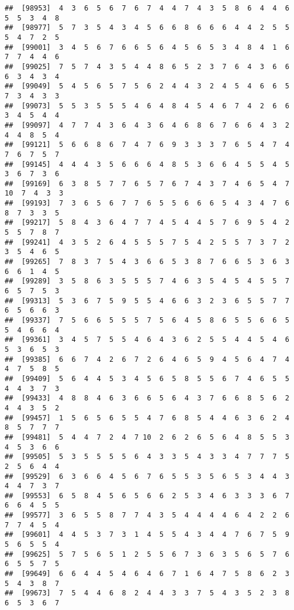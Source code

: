 \documentclass[
]{book}
\begin{document}
\begin{verbatim}
##  [98953]  4  3  6  5  6  7  6  7  4  4  7  4  3  5  8  6  4  4  6  5  5  3  4  8
##  [98977]  5  7  3  5  4  3  4  5  6  6  8  6  6  6  4  4  2  5  5  5  4  7  2  5
##  [99001]  3  4  5  6  7  6  6  5  6  4  5  6  5  3  4  8  4  1  6  7  7  4  4  6
##  [99025]  7  5  7  4  3  5  4  4  8  6  5  2  3  7  6  4  3  6  6  6  3  4  3  4
##  [99049]  5  4  5  6  5  7  5  6  2  4  4  3  2  4  5  4  6  6  5  7  3  4  3  3
##  [99073]  5  5  3  5  5  5  4  6  4  8  4  5  4  6  7  4  2  6  6  3  4  5  4  4
##  [99097]  4  7  7  4  3  6  4  3  6  4  6  8  6  7  6  6  4  3  2  4  4  8  5  4
##  [99121]  5  6  6  8  6  7  4  7  6  9  3  3  3  7  6  5  4  7  4  7  6  7  5  7
##  [99145]  4  4  4  3  5  6  6  6  4  8  5  3  6  6  4  5  5  4  5  3  6  7  3  6
##  [99169]  6  3  8  5  7  7  6  5  7  6  7  4  3  7  4  6  5  4  7 10  7  4  3  3
##  [99193]  7  3  6  5  6  7  7  6  5  5  6  6  6  5  4  3  4  7  6  8  7  3  3  5
##  [99217]  5  8  4  3  6  4  7  7  4  5  4  4  5  7  6  9  5  4  2  5  5  7  8  7
##  [99241]  4  3  5  2  6  4  5  5  5  7  5  4  2  5  5  7  3  7  2  3  5  4  6  5
##  [99265]  7  8  3  7  5  4  3  6  6  5  3  8  7  6  6  5  3  6  3  6  6  1  4  5
##  [99289]  3  5  8  6  3  5  5  5  7  4  6  3  5  4  5  4  5  5  7  6  5  7  5  3
##  [99313]  5  3  6  7  5  9  5  5  4  6  6  3  2  3  6  5  5  7  7  6  5  6  6  3
##  [99337]  7  5  6  6  5  5  5  7  5  6  4  5  8  6  5  5  6  6  5  5  4  6  6  4
##  [99361]  3  4  5  7  5  5  4  6  4  3  6  2  5  5  4  4  5  4  6  5  3  6  5  3
##  [99385]  6  6  7  4  2  6  7  2  6  4  6  5  9  4  5  6  4  7  4  4  7  5  8  5
##  [99409]  5  6  4  4  5  3  4  5  6  5  8  5  5  6  7  4  6  5  5  4  4  3  7  3
##  [99433]  4  8  8  4  6  3  6  6  5  6  4  3  7  6  6  8  5  6  2  4  4  3  5  2
##  [99457]  1  5  6  5  6  5  5  4  7  6  8  5  4  4  6  3  6  2  4  8  5  7  7  7
##  [99481]  5  4  4  7  2  4  7 10  2  6  2  6  5  6  4  8  5  5  3  4  5  3  6  6
##  [99505]  5  3  5  5  5  5  6  4  3  3  5  4  3  3  4  7  7  7  5  2  5  6  4  4
##  [99529]  6  3  6  6  4  5  6  7  6  5  5  3  5  6  5  3  4  4  3  4  4  7  3  7
##  [99553]  6  5  8  4  5  6  5  6  6  2  5  3  4  6  3  3  3  6  7  6  6  4  5  5
##  [99577]  3  6  5  5  8  7  7  4  3  5  4  4  4  4  6  4  2  2  6  7  7  4  5  4
##  [99601]  4  4  5  3  7  3  1  4  5  5  4  3  4  4  7  6  7  5  9  5  6  5  5  4
##  [99625]  5  7  5  6  5  1  2  5  5  6  7  3  6  3  5  6  5  7  6  6  5  5  7  5
##  [99649]  6  6  4  4  5  4  6  4  6  7  1  6  4  7  5  8  6  2  3  5  4  3  8  7
##  [99673]  7  5  4  4  6  8  2  4  4  3  3  7  5  4  3  5  2  3  8  6  5  3  6  7

\end{verbatim}
\end{document}
